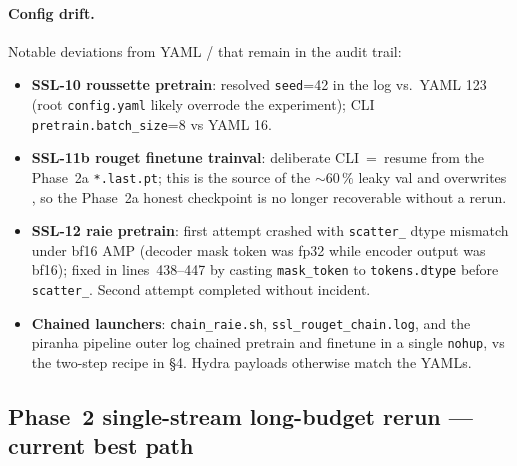 \paragraph{Config drift.}  Notable deviations from YAML /  that
remain in the audit trail:
\begin{itemize}[leftmargin=2em]
\item \textbf{SSL-10 roussette pretrain}: resolved \texttt{seed}=42 in the log
   vs.\ YAML 123 (root \texttt{config.yaml} likely overrode the
   experiment); CLI \texttt{pretrain.batch\_size}=8 vs YAML 16.
\item \textbf{SSL-11b rouget finetune trainval}: deliberate CLI
   \,=\, resume from
   the Phase~2a \texttt{*.last.pt}; this is the source of the
   \(\sim 60\,\%\) leaky val and overwrites
   , so the Phase~2a honest checkpoint is no longer
   recoverable without a rerun.
\item \textbf{SSL-12 raie pretrain}: first attempt crashed with
   \texttt{scatter\_} dtype mismatch under bf16 AMP (decoder mask token
   was fp32 while encoder output was bf16); fixed in
    lines~438--447 by
   casting \texttt{mask\_token} to \texttt{tokens.dtype} before
   \texttt{scatter\_}.  Second attempt completed without incident.
\item \textbf{Chained launchers}: \texttt{chain\_raie.sh},
   \texttt{ssl\_rouget\_chain.log}, and the piranha pipeline outer log
   chained pretrain and finetune in a single \texttt{nohup}, vs the
   two-step recipe in  \S4.  Hydra payloads otherwise match
   the YAMLs.
\end{itemize}

\subsection{Phase~2 single-stream long-budget rerun --- current best path}
\label{sec:tracka:inventory:phase2-150ep}

